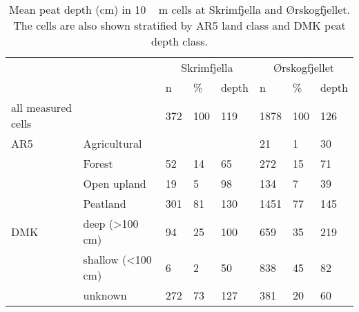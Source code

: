 \begin{table}[tbp]
\caption{Mean peat depth (cm) in \unit{10\,m} cells at Skrimfjella and Ørskogfjellet. The cells are also shown stratified by AR5 land class and DMK peat depth class.}
\begin{tabular}{llllllll}
\hline
                    &                            & \multicolumn{3}{c}{Skrimfjella} & \multicolumn{3}{c}{Ørskogfjellet} \\ \cline{3-8} 
                    &                            & n        & \%      & depth      & n          & \%      & depth      \\ \hline
all measured cells  &                            & 372      & 100     & 119        & 1878       & 100     & 126        \\
AR5                 & Agricultural               &          &         &            & 21         & 1       & 30         \\
                    & Forest                     & 52       & 14      & 65         & 272        & 15      & 71         \\
                    & Open upland                & 19       & 5       & 98         & 134        & 7       & 39         \\
                    & Peatland                   & 301      & 81      & 130        & 1451       & 77      & 145        \\
DMK                 & deep (\textgreater 100 cm) & 94       & 25      & 100        & 659        & 35      & 219        \\
                    & shallow (\textless 100 cm) & 6        & 2       & 50         & 838        & 45      & 82         \\
                    & unknown                    & 272      & 73      & 127        & 381        & 20      & 60         \\ \hline
\end{tabular}
\label{tab:depthsByClass}
\end{table}